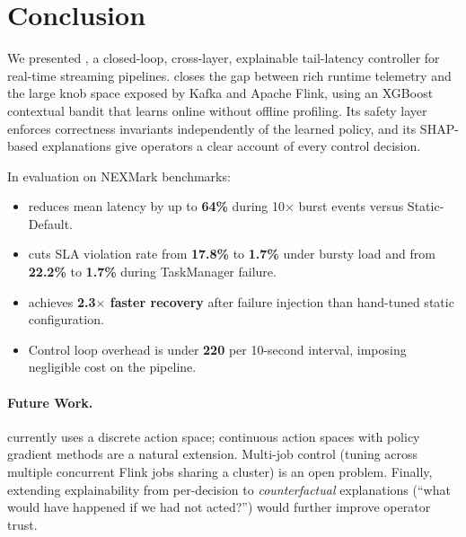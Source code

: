 \section{Conclusion}
\label{sec:conclusion}

We presented \xtal, a closed-loop, cross-layer, explainable tail-latency
controller for real-time streaming pipelines.
\xtal closes the gap between rich runtime telemetry and the large knob
space exposed by Kafka and Apache Flink, using an XGBoost contextual
bandit that learns online without offline profiling.
Its safety layer enforces correctness invariants independently of the
learned policy, and its SHAP-based explanations give operators a clear
account of every control decision.

In evaluation on NEXMark benchmarks:
\begin{itemize}
  \item \xtal reduces mean  latency by up to \textbf{64\%}
    during 10$\times$ burst events versus Static-Default.
  \item \xtal cuts SLA violation rate from \textbf{17.8\%} to \textbf{1.7\%}
    under bursty load and from \textbf{22.2\%} to \textbf{1.7\%}
    during TaskManager failure.
  \item \xtal achieves \textbf{2.3$\times$ faster recovery} after failure
    injection than hand-tuned static configuration.
  \item Control loop overhead is under \textbf{220\ms} per 10-second
    interval, imposing negligible cost on the pipeline.
\end{itemize}

\paragraph{Future Work.}
\xtal currently uses a discrete action space; continuous action spaces
with policy gradient methods are a natural extension.
Multi-job control (tuning across multiple concurrent Flink jobs sharing
a cluster) is an open problem.
Finally, extending explainability from per-decision to
\emph{counterfactual} explanations (``what would have happened if we
had not acted?'') would further improve operator trust.
